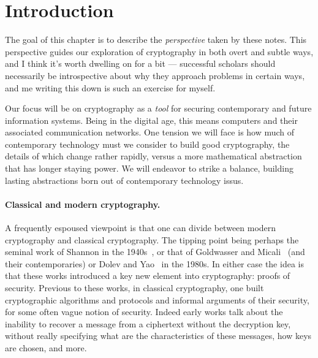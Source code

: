 \newpage
\section{Introduction}
\label{ch:intro}

The goal of this chapter is to describe the \emph{perspective} taken by these
notes. This perspective guides our exploration of cryptography in both overt and
subtle ways, and I think it's worth dwelling on for a bit --- successful
scholars should necessarily be introspective about why they approach problems in
certain ways, and me writing this down is such an exercise for myself. 
 

Our focus will be on cryptography as a \emph{tool} for securing contemporary and
future information systems. Being in the digital age, this means
computers and their associated communication networks. One tension 
we will face is how much of contemporary technology must we consider to
build good cryptography, the details of which change rather rapidly, versus a 
more mathematical abstraction that has longer staying power. We will endeavor to
strike a balance, building lasting abstractions born out of contemporary
technology issus. 


\paragraph{Classical and modern cryptography.} A frequently espoused
viewpoint is that one can divide between modern cryptography and
classical cryptography. The tipping point 
being perhaps the seminal work of Shannon in the
1940s~\cite{shannon1949communication}, or that of Goldwasser
and Micali~\cite{shafi1984probabilistic} (and their
contemporaries) or Dolev and Yao~\cite{dolev1983security}  in the 1980s. In either case the idea is that these works
introduced a key new element into cryptography: proofs of security.
Previous to these works, in classical cryptography, one built cryptographic
algorithms and protocols and informal arguments of their security, for some
often vague notion of security. Indeed early works talk about the inability to 
recover a message from a ciphertext without the decryption key, without really
specifying what are the characteristics of these messages, how keys are chosen,
and more. 


